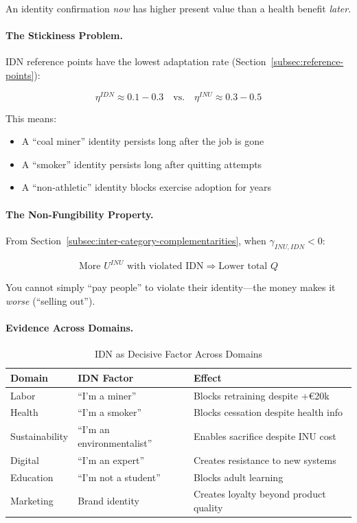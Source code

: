 An identity confirmation \emph{now} has higher present value than a health 
benefit \emph{later}.

\paragraph{The Stickiness Problem.}
IDN reference points have the lowest adaptation rate (Section~\ref{subsec:reference-points}):

\begin{equation}
\eta^{IDN} \approx 0.1-0.3 \quad \text{vs.} \quad \eta^{INU} \approx 0.3-0.5
\end{equation}

This means:
\begin{itemize}
\item A ``coal miner'' identity persists long after the job is gone
\item A ``smoker'' identity persists long after quitting attempts
\item A ``non-athletic'' identity blocks exercise adoption for years
\end{itemize}

\paragraph{The Non-Fungibility Property.}
From Section~\ref{subsec:inter-category-complementarities}, when $\gamma_{INU,IDN} < 0$:

\begin{equation}
\text{More } U^{INU} \text{ with violated IDN} \Rightarrow \text{Lower total } Q
\end{equation}

You cannot simply ``pay people'' to violate their identity---the money 
makes it \emph{worse} (``selling out'').

\paragraph{Evidence Across Domains.}

\begin{table}[htbp]
\centering
\caption{IDN as Decisive Factor Across Domains}
\label{tab:idn-evidence}
\renewcommand{\arraystretch}{1.3}
\begin{tabular}{@{}lll@{}}
\toprule
\textbf{Domain} & \textbf{IDN Factor} & \textbf{Effect} \\
\midrule
Labor & ``I'm a miner'' & Blocks retraining despite +\euro{20k} \\
Health & ``I'm a smoker'' & Blocks cessation despite health info \\
Sustainability & ``I'm an environmentalist'' & Enables sacrifice despite INU cost \\
Digital & ``I'm an expert'' & Creates resistance to new systems \\
Education & ``I'm not a student'' & Blocks adult learning \\
Marketing & Brand identity & Creates loyalty beyond product quality \\
\bottomrule
\end{tabular}
\end{table}

